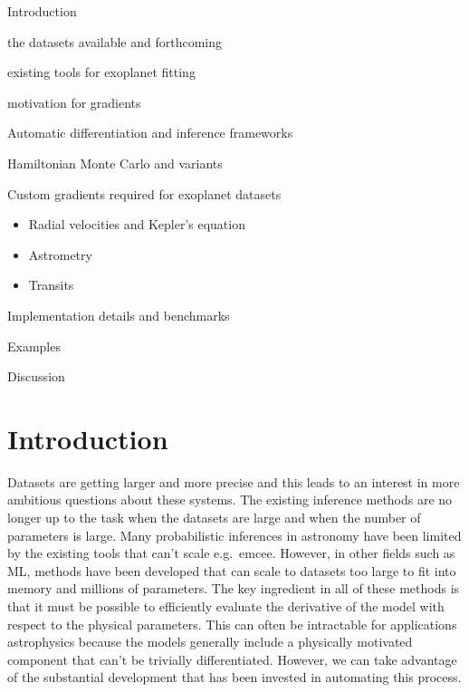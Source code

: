 \documentclass[modern]{aastex62}
\begin{document}
\begin{enumerate}

{\item Introduction
\begin{itemize}
{\item the datasets available and forthcoming}
{\item existing tools for exoplanet fitting}
{\item motivation for gradients}
\end{itemize}}

\item Automatic differentiation and inference frameworks

\item Hamiltonian Monte Carlo and variants

\item Custom gradients required for exoplanet datasets
\begin{itemize}
\item Radial velocities and Kepler's equation
\item Astrometry
\item Transits
\end{itemize}

\item Implementation details and benchmarks

\item Examples

\item Discussion

\end{enumerate}

\section{Introduction}

Datasets are getting larger and more precise and this leads to an interest in
more ambitious questions about these systems.
The existing inference methods are no longer up to the task when the datasets
are large and when the number of parameters is large.
Many probabilistic inferences in astronomy have been limited by the existing
tools that can't scale e.g.\ emcee.
However, in other fields such as ML, methods have been developed that can
scale to datasets too large to fit into memory and millions of parameters.
The key ingredient in all of these methods is that it must be possible to
efficiently evaluate the derivative of the model with respect to the physical
parameters.
This can often be intractable for applications astrophysics because the models
generally include a physically motivated component that can't be trivially
differentiated.
However, we can take advantage of the substantial development that has been
invested in automating this process.
\end{document}
